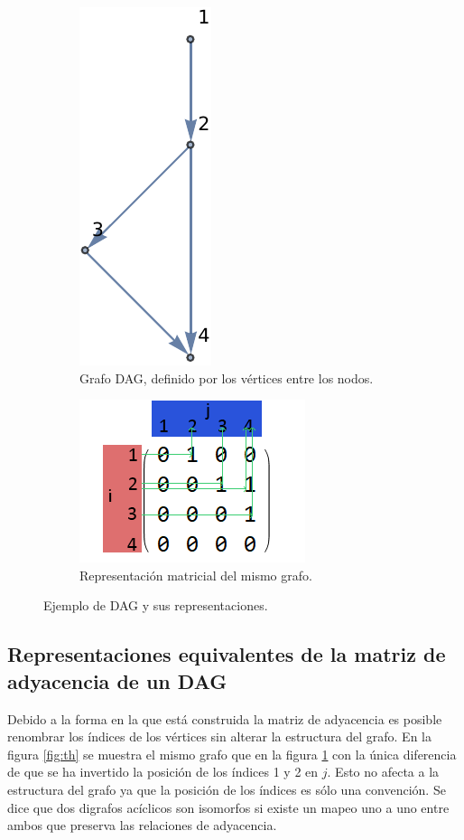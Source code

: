 \documentclass[10pt,a4paper]{article}
\begin{document}
\begin{figure}[h!]
		\begin{subfigure}{.5\textwidth}
			\centering
			\includegraphics[scale=0.45]{img/graph}
			\caption{Grafo DAG, definido por los vértices entre los nodos.}
		\end{subfigure}%
		\begin{subfigure}{.5\textwidth}
			\centering
			\includegraphics[scale=0.45]{img/ady_matrix}
			\caption{Representación matricial del mismo grafo.}
		\end{subfigure}%
		\caption{Ejemplo de DAG y sus representaciones.}
		\label{fig:grafos}
\end{figure}

\subsection{Representaciones equivalentes de la matriz de adyacencia de un DAG}
Debido a la forma en la que está construida la matriz de adyacencia es posible renombrar los índices de los vértices sin alterar la estructura del grafo. En la figura \ref{fig:th} se muestra el mismo grafo que en la figura \ref{fig:grafos} con la única diferencia de que se ha invertido la posición de los índices 1 y 2 en $j$. Esto no afecta a la estructura del grafo ya que la posición de los índices es sólo una convención. Se dice que dos digrafos acíclicos son isomorfos si existe un mapeo uno a uno entre ambos que preserva las relaciones de adyacencia.
\end{document}
